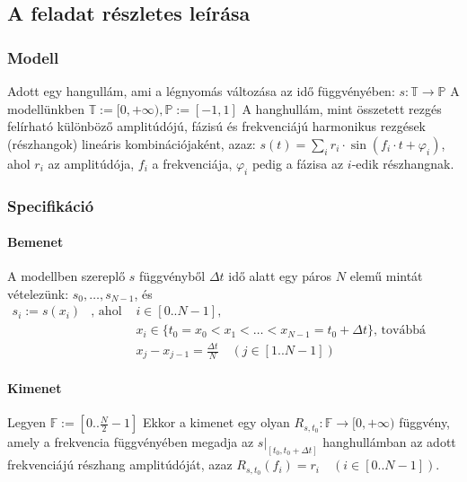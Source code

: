 
\subsection{A feladat r\'eszletes le\'ir\'asa}
\subsubsection{Modell}
Adott egy hangull\'am, ami a l\'egnyom\'as v\'altoz\'asa az id\H o f\"uggv\'eny\'eben:
\(s: \mathbb{T} \rightarrow \mathbb{P} \) \newline
A modell\"unkben $\mathbb{T}:=[0,+\infty), \mathbb{P}:=[-1,1] $ \newline
A hanghull\'am, mint \"osszetett rezg\'es fel\'irhat\'o k\"ul\"onb\"oz\H o amplit\'ud\'oj\'u, f\'azis\'u \'es frekvenci\'aj\'u harmonikus rezg\'esek (r\'eszhangok) line\'aris kombin\'aci\'ojak\'ent, azaz: \newline
\( s(t) = \sum_i r_i\cdot\sin{(f_i\cdot t + \varphi_i)} \), ahol $r_i$ az amplit\'ud\'oja, $f_i$ a frekvenci\'aja, $\varphi_i$ pedig a f\'azisa az $i$-edik r\'eszhangnak.
\subsubsection{Specifik\'aci\'o}
\paragraph{Bemenet}
A modellben szerepl\H o $s$ f\"uggv\'enyb\H ol $\Delta t$ id\H o alatt egy p\'aros $N$ elem\H u mint\'at v\'etelez\"unk: $s_0,\dots,s_{N-1}$, \'es \newline
\( \begin{array}{rcl}
s_i := s(x_i) & \text{, ahol } & i\in[0..N-1],\\
&&x_i\in\{ t_0 = x_0 < x_1 < \dots < x_{N-1} = t_0 + \Delta t \} \text{, tov\'abb\'a } \\
&&x_j - x_{j-1} = \frac{\Delta t}{N}\quad (j\in[1..N-1] ) 
\end{array} \)
\paragraph{Kimenet}
Legyen $\mathbb{F}:=\left[ 0..\frac{N}{2}-1 \right]$ \newline 
Ekkor a kimenet egy olyan $R_{s,t_0}:\mathbb{F} \rightarrow [0,+\infty)$ f\"uggv\'eny, amely a frekvencia f\"uggv\'eny\'eben megadja az $s\rvert_{[t_0,t_0+\Delta t]}$ hanghull\'amban az adott frekvenci\'aj\'u r\'eszhang amplit\'ud\'oj\'at, azaz $R_{s,t_0}(f_i) = r_i\quad (i\in [0..N-1])$.


